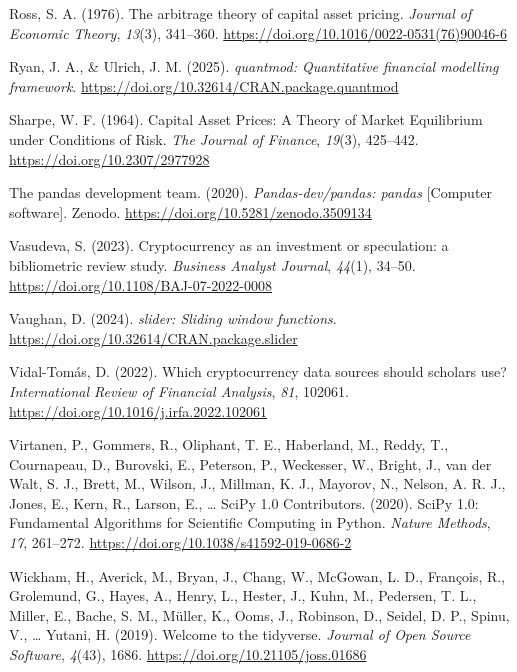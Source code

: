 \documentclass[
  12pt,
  a4paper,
  openany]{scrbook}
\newlength{\cslhangindent}
\newenvironment{CSLReferences}[2] %
 {\begin{list}{}{%
  \setlength{\itemindent}{0pt}
  \setlength{\leftmargin}{0pt}
  \setlength{\parsep}{0pt}
  \ifodd #1
   \setlength{\leftmargin}{\cslhangindent}
   \setlength{\itemindent}{-1\cslhangindent}
  \fi
  \setlength{\itemsep}{#2\baselineskip}}}
 {\end{list}}
\begin{document}
\begin{CSLReferences}{1}{0}
Ross, S. A. (1976). The arbitrage theory of capital asset pricing.
\emph{Journal of Economic Theory}, \emph{13}(3), 341--360.
\url{https://doi.org/10.1016/0022-0531(76)90046-6}

Ryan, J. A., \& Ulrich, J. M. (2025). \emph{{quantmod}: Quantitative
financial modelling framework}.
\url{https://doi.org/10.32614/CRAN.package.quantmod}

Sharpe, W. F. (1964). Capital Asset Prices: A Theory of Market
Equilibrium under Conditions of Risk. \emph{The Journal of Finance},
\emph{19}(3), 425--442. \url{https://doi.org/10.2307/2977928}

The pandas development team. (2020). \emph{Pandas-dev/pandas: pandas}
{[}Computer software{]}. Zenodo.
\url{https://doi.org/10.5281/zenodo.3509134}

Vasudeva, S. (2023). Cryptocurrency as an investment or speculation: a
bibliometric review study. \emph{Business Analyst Journal},
\emph{44}(1), 34--50. \url{https://doi.org/10.1108/BAJ-07-2022-0008}

Vaughan, D. (2024). \emph{{slider}: Sliding window functions}.
\url{https://doi.org/10.32614/CRAN.package.slider}

Vidal-Tomás, D. (2022). Which cryptocurrency data sources should
scholars use? \emph{International Review of Financial Analysis},
\emph{81}, 102061. \url{https://doi.org/10.1016/j.irfa.2022.102061}

Virtanen, P., Gommers, R., Oliphant, T. E., Haberland, M., Reddy, T.,
Cournapeau, D., Burovski, E., Peterson, P., Weckesser, W., Bright, J.,
van der Walt, S. J., Brett, M., Wilson, J., Millman, K. J., Mayorov, N.,
Nelson, A. R. J., Jones, E., Kern, R., Larson, E., \ldots{} SciPy 1.0
Contributors. (2020). {{SciPy} 1.0: Fundamental Algorithms for
Scientific Computing in Python}. \emph{Nature Methods}, \emph{17},
261--272. \url{https://doi.org/10.1038/s41592-019-0686-2}

Wickham, H., Averick, M., Bryan, J., Chang, W., McGowan, L. D.,
François, R., Grolemund, G., Hayes, A., Henry, L., Hester, J., Kuhn, M.,
Pedersen, T. L., Miller, E., Bache, S. M., Müller, K., Ooms, J.,
Robinson, D., Seidel, D. P., Spinu, V., \ldots{} Yutani, H. (2019).
Welcome to the {tidyverse}. \emph{Journal of Open Source Software},
\emph{4}(43), 1686. \url{https://doi.org/10.21105/joss.01686}


\end{CSLReferences}
\end{document}
